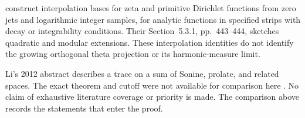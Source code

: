 \begin{description}[style=nextline,leftmargin=1em,font=\normalfont\bfseries]
\item[Interpolation from zero jets.]
\citet[Theorem~1.1, p.~408; Theorems~5.1--5.2, pp.~440, 442]{bondarenko2023}
construct interpolation bases for zeta and primitive Dirichlet
functions from zero jets and logarithmic integer samples, for analytic
functions in specified strips with decay or integrability conditions.
Their Section~5.3.1, pp.~443--444, sketches quadratic and modular
extensions. These interpolation identities do not identify the growing
orthogonal theta projection or its harmonic-measure limit.

\item[Other Hilbert-space trace constructions.]
Li's 2012 abstract describes a trace on a sum of Sonine, prolate,
and related spaces. The exact theorem and cutoff were not
available for comparison here \citep{li2012}. No claim of
exhaustive literature coverage or priority is made. The
comparison above records the statements that enter the proof.
\end{description}
